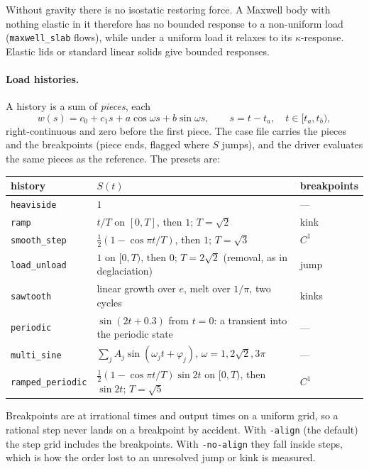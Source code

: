 \documentclass[11pt]{article}
\numberwithin{equation}{section}
\newcommand{\code}[1]{\texttt{#1}}
\begin{document}
Without gravity there is no isostatic restoring force. A Maxwell body
with nothing elastic in it therefore has no bounded response to a
non-uniform load (\code{maxwell\_slab} flows), while under a uniform load
it relaxes to its $\kappa$-response. Elastic lids or standard linear
solids give bounded responses.

\paragraph{Load histories.}
A history is a sum of \emph{pieces}, each
\begin{equation}
  w(s) = c_0 + c_1 s + a\cos\omega s + b\sin\omega s,\qquad s=t-t_a,
  \quad t\in[t_a,t_b),
  \label{eq:piece}
\end{equation}
right-continuous and zero before the first piece. The case file carries
the pieces and the breakpoints (piece ends, flagged where $S$ jumps), and
the driver evaluates the same pieces as the reference. The presets are:
\begin{center}
\small
\begin{tabular}{@{}lP{8.2cm}l@{}}
\toprule
history & $S(t)$ & breakpoints \\
\midrule
\code{heaviside} & $1$ & --- \\
\code{ramp} & $t/T$ on $[0,T]$, then $1$; $T=\sqrt2$ & kink \\
\code{smooth\_step} & $\tfrac12(1-\cos\pi t/T)$, then $1$; $T=\sqrt3$ & $C^1$ \\
\code{load\_unload} & $1$ on $[0,T)$, then $0$; $T=2\sqrt2$ (removal, as in deglaciation) & jump \\
\code{sawtooth} & linear growth over $e$, melt over $1/\pi$, two cycles & kinks \\
\code{periodic} & $\sin(2t+0.3)$ from $t=0$: a transient into the periodic state & --- \\
\code{multi\_sine} & $\sum_j A_j\sin(\omega_jt+\varphi_j)$, $\omega=1,2\sqrt2,3\pi$ & --- \\
\code{ramped\_periodic} & $\tfrac12(1-\cos\pi t/T)\sin2t$ on $[0,T)$, then $\sin 2t$; $T=\sqrt5$ & $C^1$ \\
\bottomrule
\end{tabular}
\end{center}
Breakpoints are at irrational times and output times on a uniform grid,
so a rational step never lands on a breakpoint by accident. With
\code{-align} (the default) the step grid includes the breakpoints. With
\code{-no-align} they fall inside steps, which is how the order lost to an
unresolved jump or kink is measured.
\end{document}
